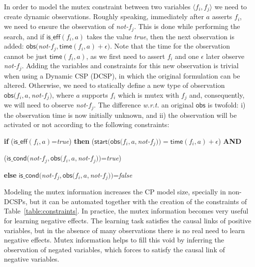 \documentclass{ecai}
\newcommand{\tup}[1]{{\langle #1 \rangle}}
\newcommand{\iscond}{\mathsf{is\_cond}}    %
\newcommand{\iseff}{\mathsf{is\_eff}}    %
\newcommand{\obs}{\mathsf{obs}}    %
\newcommand{\start}{\mathsf{start}}%
\newcommand{\supp}{\mathsf{sup}}   %
\newcommand{\tim}{\mathsf{time}}   %
\begin{document}
In order to model the mutex constraint between two variables $\tup{f_i, f_j}$ we need to create dynamic observations. Roughly speaking, immediately after $a$ asserts $f_i$, we need to ensure the observation of \textit{not-}$f_j$.
This is done while performing the search, and if $\iseff(f_i,a)$ takes the value \textit{true}, then the next observation
is added:
$\obs($\textit{not-}$f_j,\tim(f_i,a)+\epsilon)$. Note that the time for the observation cannot be just $\tim(f_i,a)$, as we first need to assert $f_i$ and one $\epsilon$ later observe \textit{not-}$f_j$.
Adding the variables and constraints for this new observation is trivial when using a Dynamic CSP (DCSP), in which the original formulation can be altered.
Otherwise, we need to statically define a new type of observation $\obs(f_i,a,$\textit{not-}$f_j)$, where $a$ supports $f_i$ which is mutex with $f_j$ and, consequently, we will need to observe \textit{not-}$f_j$. The difference \textit{w.r.t.} an original $\obs$ is twofold: i) the observation time is now initially unknown, and ii) the observation will be activated or not according to the following constraints:
\newline

{\scriptsize 

\textbf{if} ($\iseff(f_i,a)$=\textit{true}) \textbf{then} ($\start(\obs(f_i,a,$\textit{not-}$f_j))=\tim(f_i,a)+\epsilon$) \textbf{AND}

\hspace{2.83cm}($\iscond($\textit{not-}$f_j,\obs(f_i,a,$\textit{not-}$f_j))$=\textit{true})

\textbf{else} $\iscond($\textit{not-}$f_j,\obs(f_i,a,$\textit{not-}$f_j))$=\textit{false}
\newline
}



Modeling the mutex information increases the CP model size, specially in non-DCSPs, but it can be automated together with the creation of the constraints of Table~\ref{table:constraints}.
In practice, the mutex information becomes very useful for learning negative effects. The learning task satisfies the causal links of positive variables, but in the absence of many observations there is no real need to learn negative effects.
Mutex information helps to fill this void by inferring the observation of negated variables, which forces to satisfy the causal link of negative variables. 
\end{document}
